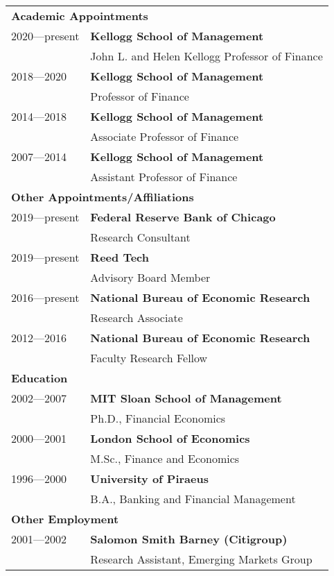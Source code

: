 \documentclass[11pt,letterpaper,serif,overlapped]{res}
\begin{document}
\begin{resume}
\begin{tabular}{ll}\\[1cm]
\multicolumn{2}{l}{\textbf{Academic Appointments}}\\
[0.25cm]
2020---present & \textbf{Kellogg School of Management}\\
& John L. and Helen Kellogg Professor of Finance\\
2018---2020 & \textbf{Kellogg School of Management}\\
& Professor of Finance\\
2014---2018 & \textbf{Kellogg School of Management}\\
& Associate Professor of Finance\\
 2007---2014 & \textbf{Kellogg School of Management}\\
& Assistant Professor of Finance\\
[0.5cm]
\multicolumn{2}{l}{\textbf{Other Appointments/Affiliations}}\\
[0.25cm]
2019---present & \textbf{Federal Reserve Bank of Chicago}\\
& Research Consultant \\[0.1cm]
2019---present & \textbf{Reed Tech}\\
& Advisory Board Member\\[0.1cm]
2016---present & \textbf{National Bureau of Economic Research  }\\
& Research Associate\\[0.1cm]
2012---2016 & \textbf{National Bureau of Economic Research}\\
& Faculty Research Fellow\\
[0.5cm]
\multicolumn{2}{l}{\textbf{Education}}\\
[0.25cm]
2002---2007 & \textbf{MIT Sloan School of Management}\\
& Ph.D., Financial Economics\\[0.1cm]
2000---2001 & \textbf{London School of Economics}\\
& M.Sc., Finance and Economics \\[0.1cm]
1996---2000 & \textbf{University of Piraeus} \\
& B.A., Banking and Financial Management\\
[0.5cm]
\multicolumn{2}{l}{\textbf{Other Employment}}\\
[0.25cm]
2001---2002 & \textbf{Salomon Smith Barney (Citigroup)}\\
& Research Assistant, Emerging Markets Group\\
\end{tabular}

\end{resume}
\end{document}

